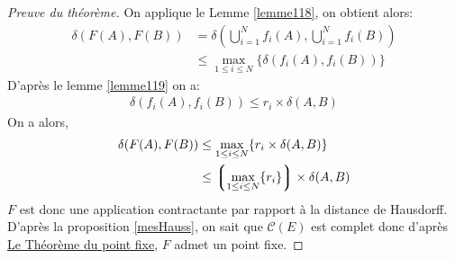 \documentclass[a4paper, 12pt]{report}
\begin{document}
			\begin{proof}[Preuve du théorème]
				On applique le Lemme \ref{lemme118}, on obtient alors:
				\begin{align*}
					\delta(F(A),F(B))	&=\delta(\bigcup_{i=1}^N f_i(A),\bigcup_{i=1}^N f_i(B))\\
										&\leq\max_{1\leq i\leq N}\{\delta(f_i(A),f_i(B))\}
				\end{align*}
				D'après le lemme \ref{lemme119} on a:
				\begin{align*}
					\delta(f_i(A),f_i(B))\leq r_i\times\delta(A,B)
				\end{align*}
				On a alors,
				\begin{align*}
					\delta(F(A),F(B))	&\leq\max_{1\leq i\leq N}\{r_i\times\delta(A,B)\}\\
										&\leq \left\lgroup\max_{1\leq i\leq N}\{r_i\}\right\rgroup\times\delta(A,B)
				\end{align*}
				$F$ est donc une application contractante par rapport à la distance de Hausdorff. D'après la proposition \ref{mesHauss}, on sait que $\mathcal{C}(E)$ est complet donc d'après \hyperref[ThmPtFixe]{Le Théorème du point fixe}, $F$ admet un point fixe.
			\end{proof}
\end{document}
